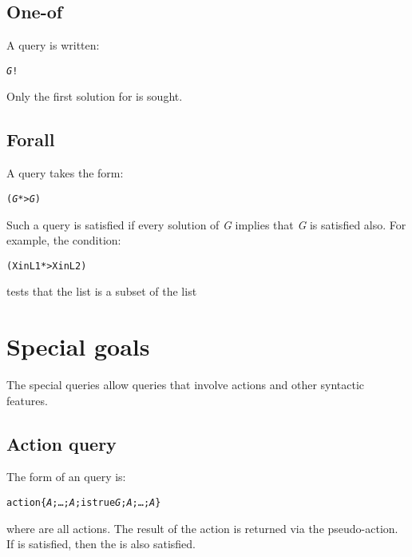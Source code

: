 \subsection{One-of}
\label{goal:oneof}

A  query is written:
\begin{alltt}
\emph{G}!
\end{alltt}
Only the first solution for  is sought.

\subsection{Forall}
\label{goal:forall}

A  query takes the form:
\begin{alltt}
(\emph{G} *> \emph{G})
\end{alltt}
Such a query is satisfied if every solution of \emph{G} implies that \emph{G} is satisfied also. For example, the condition:
\begin{alltt}
(X in L1 *> X in L2)
\end{alltt}
tests that the list  is a subset of the list 

\section{Special goals}
\label{goals:special}

The special queries allow queries that involve actions and other syntactic features.

\subsection{Action query}
\label{goal:special:action}

The form of an  query is:
\begin{alltt}
action\{ \emph{A};\ldots;\emph{A};istrue \emph{G};\emph{A};\ldots;\emph{A\subn}\}
\end{alltt}
where  are all actions. The result of the action is returned via the  pseudo-action. If  is satisfied, then the  is also satisfied.

